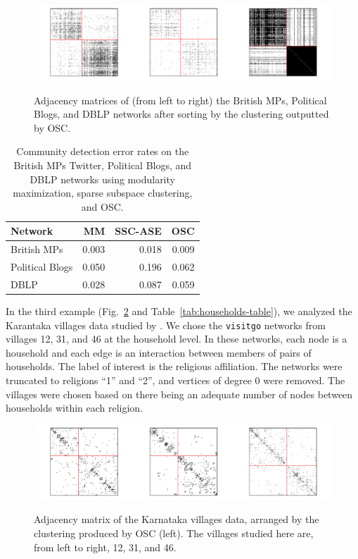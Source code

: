 \documentclass[12pt]{article}
\begin{document}
\begin{figure}[H]
{\centering \includegraphics{summary_files/figure-latex/mp-1}
}
\caption{Adjacency matrices of (from left to right) the British MPs, Political Blogs, and DBLP networks after sorting by the clustering outputted by OSC.}\label{fig:mp}
\end{figure}

\begin{table}
\centering
\begin{tabular}[t]{l|r|r|r}
\hline
Network & MM & SSC-ASE & OSC\\
\hline
British MPs & 0.003 & 0.018 & 0.009\\
\hline
Political Blogs & 0.050 & 0.196 & 0.062\\
\hline
DBLP & 0.028 & 0.087 & 0.059\\
\hline
\end{tabular}
\caption{\label{tab:unnamed-chunk-6}Community detection error rates on the British MPs Twitter, Political Blogs, and DBLP networks using modularity maximization, sparse subspace clustering, and OSC.}
\end{table}

In the third example (Fig.~\ref{fig:households-figure} and 
Table~\ref{tab:households-table}), 
we analyzed the Karantaka villages data studied by
\citet{DVN/U3BIHX_2013}. We chose the \texttt{visitgo}
networks from villages 12, 31, and 46 at the household level. 
In these networks, each node is a household and each edge is 
an interaction between members of pairs of households. 
The label of interest is the religious affiliation. 
The networks were truncated to religions ``1'' and ``2'', 
and vertices of degree 0 were removed. 
The villages were chosen based on there being an adequate number of nodes 
between households within each religion. 

\begin{figure}[tp]
{\centering \includegraphics{summary_files/figure-latex/unnamed-chunk-7-1}
}
\caption{Adjacency matrix of the Karnataka villages data, arranged by the clustering produced by OSC (left). The villages studied here are, from left to right, 12, 31, and 46.}\label{fig:households-figure}
\end{figure}
\end{document}
